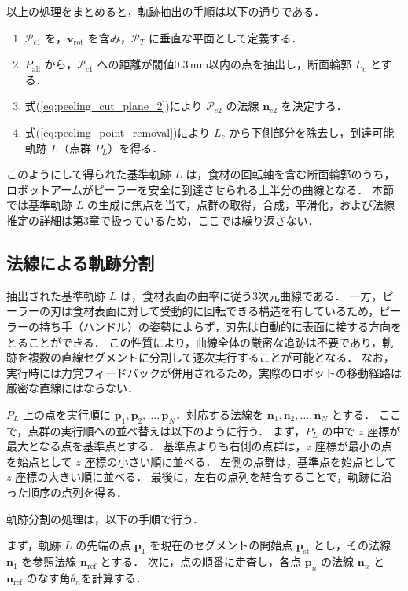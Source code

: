 以上の処理をまとめると，軌跡抽出の手順は以下の通りである．

\begin{enumerate}
  \item $\mathcal{P}_{c1}$ を，$\mathbf{v}_{\mathrm{rot}}$ を含み，$\mathcal{P}_T$ に垂直な平面として定義する．
  \item $P_{\mathrm{all}}$ から，$\mathcal{P}_{c1}$ への距離が閾値0.3\,mm以内の点を抽出し，断面輪郭 $L_c$ とする．
  \item 式(\ref{eq:peeling_cut_plane_2})により $\mathcal{P}_{c2}$ の法線 $\mathbf{n}_{c2}$ を決定する．
  \item 式(\ref{eq:peeling_point_removal})により $L_c$ から下側部分を除去し，到達可能軌跡 $L$（点群 $P_L$）を得る．
\end{enumerate}

このようにして得られた基準軌跡 $L$ は，食材の回転軸を含む断面輪郭のうち，ロボットアームがピーラーを安全に到達させられる上半分の曲線となる．
本節では基準軌跡 $L$ の生成に焦点を当て，点群の取得，合成，平滑化，および法線推定の詳細は第3章で扱っているため，ここでは繰り返さない．

\subsection{法線による軌跡分割}
\label{sec:peeling_trajectory_segmentation}

抽出された基準軌跡 $L$ は，食材表面の曲率に従う3次元曲線である．
一方，ピーラーの刃は食材表面に対して受動的に回転できる構造を有しているため，ピーラーの持ち手（ハンドル）の姿勢によらず，刃先は自動的に表面に接する方向をとることができる．
この性質により，曲線全体の厳密な追跡は不要であり，軌跡を複数の直線セグメントに分割して逐次実行することが可能となる．
なお，実行時には力覚フィードバックが併用されるため，実際のロボットの移動経路は厳密な直線にはならない．

$P_L$ 上の点を実行順に $\mathbf{p}_1, \mathbf{p}_2, \ldots, \mathbf{p}_N$，対応する法線を $\mathbf{n}_1, \mathbf{n}_2, \ldots, \mathbf{n}_N$ とする．
ここで，点群の実行順への並べ替えは以下のように行う．
まず，$P_L$ の中で $z$ 座標が最大となる点を基準点とする．
基準点よりも右側の点群は，$z$ 座標が最小の点を始点として $z$ 座標の小さい順に並べる．
左側の点群は，基準点を始点として $z$ 座標の大きい順に並べる．
最後に，左右の点列を結合することで，軌跡に沿った順序の点列を得る．

軌跡分割の処理は，以下の手順で行う．

まず，軌跡 $L$ の先端の点 $\mathbf{p}_1$ を現在のセグメントの開始点 $\mathbf{p}_{\mathrm{st}}$ とし，その法線 $\mathbf{n}_1$ を参照法線 $\mathbf{n}_{\mathrm{ref}}$ とする．
次に，点の順番に走査し，各点 $\mathbf{p}_n$ の法線 $\mathbf{n}_n$ と $\mathbf{n}_{\mathrm{ref}}$ のなす角$\theta_n$を計算する．

